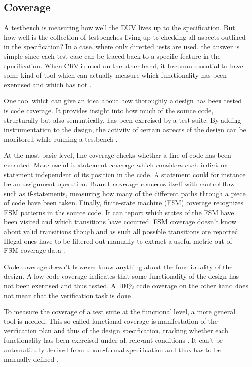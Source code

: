 \documentclass[11pt]{report}
\begin{document}
\subsection{Coverage} %

A testbench is measuring how well the DUV lives up to the specification. But how well is the collection of
testbenches living up to checking all aspects outlined in the specification? In a case, where only directed tests are
used, the answer is simple since each test case can be traced back to a specific feature in the specification. When
CRV is used on the other hand, it becomes essential to have some kind of tool which can actually measure which
functionality has been exercised and which has not \cite[Ch. 15]{mehta2021introduction}.

One tool which can give an idea about how thoroughly a design has been tested is code coverage. It provides insight
into how much of the source code, structurally but also semantically, has been exercised by a test suite. By adding
instrumentation to the design, the activity of certain aspects of the design can be monitored while running a
testbench \cite[Ch. 2]{bergeron2012writing}.

At the most basic level, line coverage checks whether a line of code has been executed. More useful is statement
coverage which considers each individual statement independent of its position in the code. A statement could for
instance be an assignment operation. Branch coverage concerns itself with control flow such as if-statements,
measuring how many of the different paths through a piece of code have been taken. Finally, finite-state machine
(FSM) coverage recognizes FSM patterns in the source code. It can report which states of the FSM have been visited
and which transitions have occurred. FSM coverage doesn't know about valid transitions though and as such all
possible transitions are reported. Illegal ones have to be filtered out manually to extract a useful metric out of
FSM coverage data \cite[Ch. 15]{mehta2021introduction}.

Code coverage doesn't however know anything about the functionality of the design. A low code coverage indicates that
some functionality of the design has not been exercised and thus tested. A 100\% code coverage on the other hand does
not mean that the verification task is done \cite[Ch. 2]{bergeron2012writing}.

To measure the coverage of a test suite at the functional level, a more general tool is needed. This so-called
functional coverage is manifestation of the verification plan and thus of the design specification, tracking whether
each functionality has been exercised under all relevant conditions \cite[Sec. 7.6]{flake2020a}. It can't be
automatically derived from a non-formal specification and thus has to be manually defined \cite[Ch. 15]{mehta2021introduction}.
\end{document}
